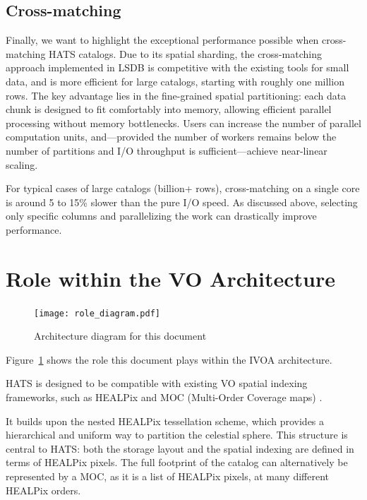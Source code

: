 \documentclass[11pt,a4paper]{ivoa}
\begin{document}
\subsection{Cross-matching}
Finally, we want to highlight the exceptional performance possible when cross-matching HATS catalogs. 
Due to its spatial sharding, the cross-matching approach implemented in LSDB is competitive with the existing tools for small data, and is more efficient for large catalogs, starting with roughly one million rows. 
The key advantage lies in the fine-grained spatial partitioning: each data chunk is designed to fit comfortably into memory, allowing efficient parallel processing without memory bottlenecks. Users can increase the number of parallel computation units, and—provided the number of workers remains below the number of partitions and I/O throughput is sufficient—achieve near-linear scaling. \par 

For typical cases of large catalogs (billion+ rows), cross-matching on a single core is around 5 to 15\% slower than the pure I/O speed. 
As discussed above, selecting only specific columns and parallelizing the work can drastically improve performance.   

\section{Role within the VO Architecture}

\begin{figure}
\centering

\texttt{[image: role\_diagram.pdf]}
\caption{Architecture diagram for this document}
\label{fig:archdiag}
\end{figure}

Figure~\ref{fig:archdiag} shows the role this document plays within the IVOA architecture.

HATS is designed to be compatible with existing VO spatial indexing frameworks, such as HEALPix \citep{gorski:healpix} and MOC (Multi-Order Coverage maps) \citep{ivoa:MOC}. \par
It builds upon the nested HEALPix tessellation scheme, which provides a hierarchical and uniform way to partition the celestial sphere. This structure is central to HATS: both the storage layout and the spatial indexing are defined in terms of HEALPix pixels.
The full footprint of the catalog can alternatively be represented by a MOC, as it is a list of HEALPix pixels, at many different HEALPix orders. \par 
\end{document}
